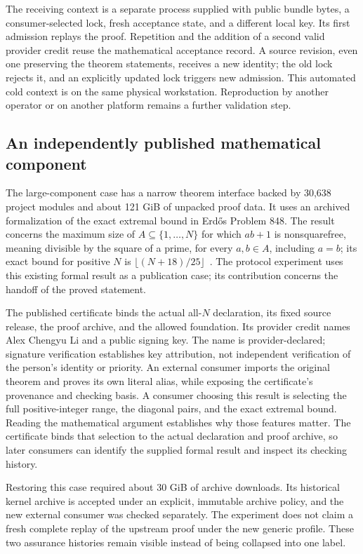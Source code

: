\documentclass[11pt]{article}
\begin{document}
The receiving context is a separate process supplied with public bundle bytes,
a consumer-selected lock, fresh acceptance state, and a different local key.
Its first admission replays the proof. Repetition and the addition of a second
valid provider credit reuse the mathematical acceptance record. A source
revision, even one preserving the theorem statements, receives a new identity;
the old lock rejects it, and an explicitly updated lock triggers new admission.
This automated cold context is on the same physical workstation. Reproduction
by another operator or on another platform remains a further validation step.

\subsection{An independently published mathematical component}

The large-component case has a narrow theorem interface backed by 30,638
project modules and about 121 GiB of unpacked proof data. It uses an archived
formalization of the exact extremal bound in Erdős Problem 848. The result
concerns the maximum size of
$A\subseteq\{1,\ldots,N\}$ for which $ab+1$ is nonsquarefree, meaning divisible by the square of a prime, for every
$a,b\in A$, including $a=b$; its exact bound for positive $N$ is
\mbox{$\lfloor(N+18)/25\rfloor$}~\citep{erdos848}. The protocol experiment uses this existing formal result as a publication
case; its contribution concerns the handoff of the proved statement.

The published certificate binds the actual all-$N$ declaration, its fixed
source release, the proof archive, and the allowed foundation. Its provider
credit names Alex Chengyu Li and a public signing key. The name is
provider-declared; signature verification establishes key attribution, not
independent verification of the person's identity or priority. An external
consumer imports the original theorem and proves its own literal alias, while
exposing the certificate's provenance and checking basis. A consumer choosing
this result is selecting the full positive-integer range, the diagonal pairs,
and the exact extremal bound. Reading the mathematical argument establishes
why those features matter. The certificate binds that selection to the actual
declaration and proof archive, so later consumers can identify the supplied
formal result and inspect its checking history.

Restoring this case required about 30 GiB of archive downloads. Its historical
kernel archive is accepted under an explicit, immutable archive policy, and
the new external consumer was checked separately. The experiment does not
claim a fresh complete replay of the upstream proof under the new generic
profile. These two assurance histories remain visible instead of being
collapsed into one label.
\end{document}
